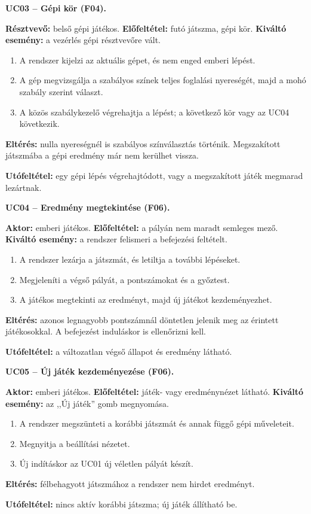 \documentclass[11pt,a4paper]{article}
\begin{document}
\textbf{UC03 -- Gépi kör (F04).}

\textbf{Résztvevő:} belső gépi játékos.
\textbf{Előfeltétel:} futó játszma, gépi kör.
\textbf{Kiváltó esemény:} a vezérlés gépi résztvevőre vált.
\begin{enumerate}
\item A rendszer kijelzi az aktuális gépet, és nem enged emberi lépést.
\item A gép megvizsgálja a szabályos színek teljes foglalási nyereségét,
  majd a mohó szabály szerint választ.
\item A közös szabálykezelő végrehajtja a lépést; a következő kör
  vagy az UC04 következik.
\end{enumerate}
\textbf{Eltérés:} nulla nyereségnél is szabályos színválasztás történik.
  Megszakított játszmába a gépi eredmény már nem kerülhet vissza.
\par\textbf{Utófeltétel:} egy gépi lépés végrehajtódott, vagy a megszakított játék megmarad lezártnak.

\textbf{UC04 -- Eredmény megtekintése (F06).}

\textbf{Aktor:} emberi játékos.
\textbf{Előfeltétel:} a pályán nem maradt semleges mező.
\textbf{Kiváltó esemény:} a rendszer felismeri a befejezési feltételt.
\begin{enumerate}
\item A rendszer lezárja a játszmát, és letiltja a további lépéseket.
\item Megjeleníti a végső pályát, a pontszámokat és a győztest.
\item A játékos megtekinti az eredményt, majd új játékot kezdeményezhet.
\end{enumerate}
\textbf{Eltérés:} azonos legnagyobb pontszámnál döntetlen jelenik meg
  az érintett játékosokkal. A befejezést induláskor is ellenőrizni kell.
\par\textbf{Utófeltétel:} a változatlan végső állapot és eredmény látható.

\textbf{UC05 -- Új játék kezdeményezése (F06).}

\textbf{Aktor:} emberi játékos.
\textbf{Előfeltétel:} játék- vagy eredménynézet látható.
\textbf{Kiváltó esemény:} az ,,Új játék'' gomb megnyomása.
\begin{enumerate}
\item A rendszer megszünteti a korábbi játszmát és annak függő gépi műveleteit.
\item Megnyitja a beállítási nézetet.
\item Új indításkor az UC01 új véletlen pályát készít.
\end{enumerate}
\textbf{Eltérés:} félbehagyott játszmához a rendszer nem hirdet eredményt.
\par\textbf{Utófeltétel:} nincs aktív korábbi játszma; új játék állítható be.
\end{document}

